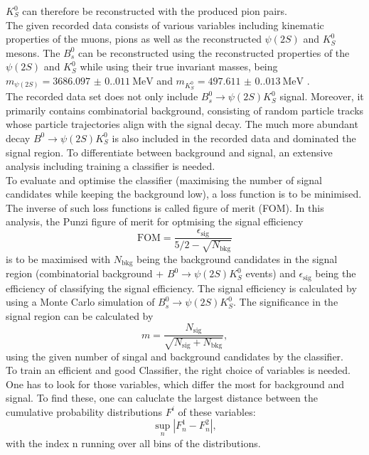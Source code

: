 $K_S^0$ can therefore be reconstructed with the produced pion pairs.\\
The given recorded data consists of various variables including kinematic properties of the muons, pions as well as the reconstructed $\psi (2S)$ and $K_S^0$ mesons. The $B_s^0$ can be reconstructed using the reconstructed
properties of the $\psi (2S)$ and $K_S^0$ while using their true invariant masses, being $m_{\psi (2S)} = \qty{3686.097(0.011)}{\mega\electronvolt}$ and $m_{K_S^0} = \qty{497.611(0.013)}{\mega\electronvolt}$ \cite{PDG}.\\
The recorded data set does not only include $B_s^0 \to \psi (2S)K_S^0$ signal. Moreover, it primarily contains combinatorial background, consisting of random particle tracks whose particle trajectories align with the
signal decay. The much more abundant decay $B^0 \to \psi (2S)K_S^0$ is also included in the recorded data and dominated the signal region. To differentiate between background and signal, an extensive analysis including
training a classifier is needed.\\
To evaluate and optimise the classifier (maximising the number of signal candidates while keeping the background low), a loss function is to be minimised. The inverse of such loss functions is called figure of merit (FOM).
In this analysis, the Punzi figure of merit for optmising the signal efficiency
\begin{equation}
    \label{eq:FOM}
    \mathrm{FOM}  = \frac{\epsilon_{\mathrm{sig}}}{5/2 - \sqrt{N_{\mathrm{bkg}}}}
\end{equation}
is to be maximised with $N_{\mathrm{bkg}}$ being the background candidates in the signal region (combinatorial background + $B^0 \to \psi (2S)K_S^0$ events) and $\epsilon_{\mathrm{sig}}$ being the efficiency of classifying
the signal efficiency. The signal efficiency is calculated by using a Monte Carlo simulation of $B_s^0 \to \psi (2S)K_S^0$. The significance in the signal region can be calculated by
\begin{equation}
    \label{eq:sign}
    m = \frac{N_{\mathrm{sig}}}{\sqrt{N_{\mathrm{sig}} + N_{\mathrm{bkg}}}},
\end{equation}
using the given number of singal and background candidates by the classifier.\\
To train an efficient and good Classifier, the right choice of variables is needed. One has to look for those variables, which differ the most for background and signal. To find these, one can caluclate the 
largest distance between the cumulative probability distributions $F^i$ of these variables:
\begin{equation}
    \label{eq:Kolmogorov}
    \sup\limits_{n} | F_n^1 - F_n^2 |,
\end{equation}
with the index n running over all bins of the distributions. 